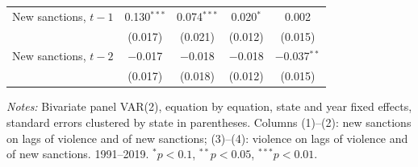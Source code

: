 \begin{table}[htbp]
\begin{threeparttable}
\begin{tabular}{lcccc}
\quad New sanctions, $t-1$ & 0.130$^{***}$ & 0.074$^{***}$ & 0.020$^{*}$ & 0.002 \\
 & (0.017) & (0.021) & (0.012) & (0.015) \\
\quad New sanctions, $t-2$ & $-$0.017 & $-$0.018 & $-$0.018 & $-$0.037$^{**}$ \\
 & (0.017) & (0.018) & (0.012) & (0.015) \\
\bottomrule
\end{tabular}
\begin{tablenotes}[flushleft]\footnotesize
\item \textit{Notes:} Bivariate panel VAR(2), equation by equation, state and year fixed effects, standard errors clustered by state in parentheses. Columns (1)--(2): new sanctions on lags of violence and of new sanctions; (3)--(4): violence on lags of violence and of new sanctions. 1991--2019. $^{*}p<0.1$, $^{**}p<0.05$, $^{***}p<0.01$.
\end{tablenotes}
\end{threeparttable}
\end{table}
